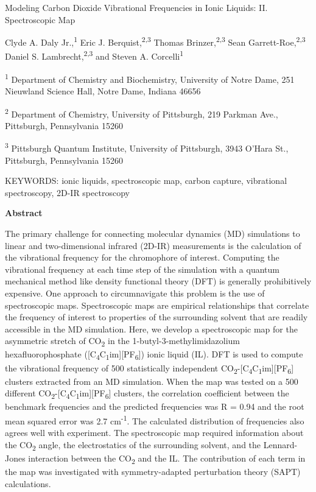 \documentclass[]{article}
\date{}
\begin{document}
Modeling Carbon Dioxide Vibrational Frequencies in Ionic Liquids: II.
Spectroscopic Map

Clyde A. Daly Jr.,\textsuperscript{1} Eric J.
Berquist,\textsuperscript{2,3} Thomas Brinzer,\textsuperscript{2,3} Sean
Garrett-Roe,\textsuperscript{2,3} Daniel S.
Lambrecht,\textsuperscript{2,3} and Steven A.
Corcelli\textsuperscript{1}

\textsuperscript{1} Department of Chemistry and Biochemistry, University
of Notre Dame, 251 Nieuwland Science Hall, Notre Dame, Indiana 46656

\textsuperscript{2} Department of Chemistry, University of Pittsburgh,
219 Parkman Ave., Pittsburgh, Pennsylvania 15260

\textsuperscript{3} Pittsburgh Quantum Institute, University of
Pittsburgh, 3943 O'Hara St., Pittsburgh, Pennsylvania 15260

KEYWORDS: ionic liquids, spectroscopic map, carbon capture, vibrational
spectroscopy, 2D-IR spectroscopy

\textbf{Abstract}

The primary challenge for connecting molecular dynamics (MD) simulations
to linear and two-dimensional infrared (2D-IR) measurements is the
calculation of the vibrational frequency for the chromophore of
interest. Computing the vibrational frequency at each time step of the
simulation with a quantum mechanical method like density functional
theory (DFT) is generally prohibitively expensive. One approach to
circumnavigate this problem is the use of spectroscopic maps.
Spectroscopic maps are empirical relationships that correlate the
frequency of interest to properties of the surrounding solvent that are
readily accessible in the MD simulation. Here, we develop a
spectroscopic map for the asymmetric stretch of CO\textsubscript{2} in
the 1-butyl-3-methylimidazolium hexafluorophosphate
({[}C\textsubscript{4}C\textsubscript{1}im{]}{[}PF\textsubscript{6}{]})
ionic liquid (IL). DFT is used to compute the vibrational frequency of
500 statistically independent
CO\textsubscript{2}-{[}C\textsubscript{4}C\textsubscript{1}im{]}{[}PF\textsubscript{6}{]}
clusters extracted from an MD simulation. When the map was tested on a
500 different
CO\textsubscript{2}-{[}C\textsubscript{4}C\textsubscript{1}im{]}{[}PF\textsubscript{6}{]}
clusters, the correlation coefficient between the benchmark frequencies
and the predicted frequencies was R = 0.94 and the root mean squared
error was 2.7 cm\textsuperscript{-1}. The calculated distribution of
frequencies also agrees well with experiment. The spectroscopic map
required information about the CO\textsubscript{2} angle, the
electrostatics of the surrounding solvent, and the Lennard-Jones
interaction between the CO\textsubscript{2} and the IL. The contribution
of each term in the map was investigated with symmetry-adapted
perturbation theory (SAPT) calculations.
\end{document}
